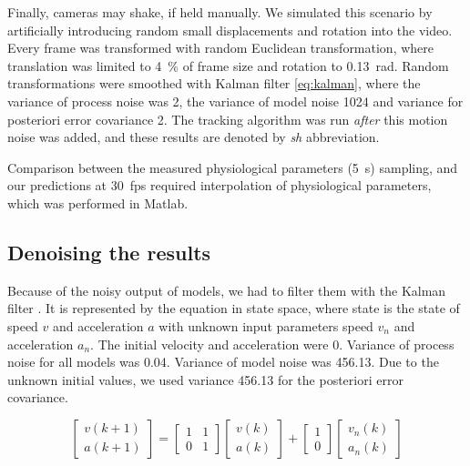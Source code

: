 Finally, cameras may shake, if held manually. We simulated this scenario by artificially introducing random small displacements and rotation into the video. Every frame was transformed with random Euclidean transformation, where translation was limited to \SI{4}{\%} of frame size and rotation to \SI{0.13}{rad}. Random transformations were smoothed with Kalman filter \eqref{eq:kalman}, where the variance of process noise was \num{2}, the variance of model noise \num{1024} and variance for posteriori error covariance \num{2}. The tracking algorithm was run \emph{after} this motion noise was added, and these results are denoted by \textit{sh} abbreviation.

Comparison between the measured physiological parameters (\SI{5}{\s}) sampling, and our predictions at \SI{30}{fps} required interpolation of physiological parameters, which was performed in Matlab.



\subsection{Denoising the results}

Because of the noisy output of models, we had to filter them with the Kalman filter \cite{forsyth2002computer}. It is represented by the equation  in state space, where state is the state of speed $v$ and acceleration $a$ with unknown input parameters speed $v_n$ and acceleration $a_n$. The initial velocity and acceleration were $0$. Variance of process noise for all models was \num{0.04}. Variance of model noise was \num{456.13}. Due to the unknown initial values, we used variance \num{456.13} for the posteriori error covariance.

\begin{equation} \label{eq:kalman}
    \begin{bmatrix}
		v(k + 1) \\ a(k + 1)
	\end{bmatrix}
    =
    \begin{bmatrix}
		1 & 1 \\ 0 & 1
	\end{bmatrix}
    \begin{bmatrix}
		v(k) \\ a(k)
	\end{bmatrix}
    +
    \begin{bmatrix}
		1 \\ 0
	\end{bmatrix}
    \begin{bmatrix}
		v_{n}(k) \\ a_n(k)
	\end{bmatrix}
\end{equation}

